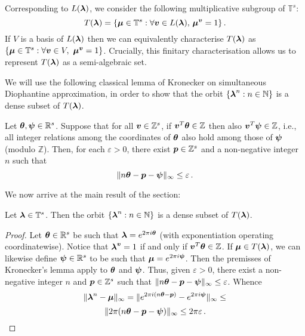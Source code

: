 Corresponding to $L(\boldsymbol{\lambda})$, we consider the following
multiplicative subgroup of $\mathbb{T}^s$:
\begin{equation*}
T(\boldsymbol{\lambda})=\lbrace \boldsymbol \mu\in\mathbb{T}^s : \forall \boldsymbol v\in L(\boldsymbol\lambda),\,\boldsymbol\mu^{\boldsymbol v}=1\rbrace \, .
\end{equation*}
If $V$ is a basis of $L(\boldsymbol{\lambda})$ then we can
equivalently characterise $T(\boldsymbol{\lambda})$ as $\{
\boldsymbol{\mu} \in \mathbb{T}^s: \forall \boldsymbol{v}\in
V,\,\,\boldsymbol\mu^{\boldsymbol v}=1\}$.  Crucially, this finitary
characterisation allows us to represent $T(\boldsymbol\lambda)$ as a
semi-algebraic set.

We will use the following classical lemma of Kronecker on simultaneous
Diophantine approximation, in order to show that the orbit $\lbrace
\boldsymbol\lambda^n : n\in\mathbb{N} \rbrace$ is a dense subset of
$T(\boldsymbol{\lambda})$.

\begin{lemma}
  Let $\boldsymbol \theta,\boldsymbol \psi\in\mathbb{R}^s$. Suppose that for all $\boldsymbol v\in\mathbb{Z}^s$, if
  $\boldsymbol v^T\boldsymbol \theta\in\mathbb{Z}$ then also
  $\boldsymbol v^T\boldsymbol\psi\in\mathbb{Z}$, i.e., all integer
  relations among the coordinates of $\boldsymbol \theta$ also hold
  among those of $\boldsymbol\psi$ (modulo $\mathbb{Z}$). Then, for
  each $\varepsilon>0$, there exist $\boldsymbol p\in\mathbb{Z}^s$ and
  a non-negative integer $n$ such that
\[ \| n\boldsymbol\theta - \boldsymbol p - \boldsymbol\psi \|_\infty \leq\varepsilon \, .\]
\end{lemma}

We now arrive at the main result of the section:

\begin{theorem}
\label{dense}
Let $\boldsymbol{\lambda}\in\mathbb{T}^s$. Then the orbit $\lbrace \boldsymbol\lambda^n : n\in\mathbb{N} \rbrace$ is a dense subset of $T(\boldsymbol{\lambda})$.
\end{theorem}

\begin{proof}
  Let $\boldsymbol \theta\in\mathbb{R}^s$ be such that
  $\boldsymbol\lambda=e^{2\pi i\boldsymbol\theta}$ (with
  exponentiation operating coordinatewise). Notice that
  $\boldsymbol\lambda^{\boldsymbol v}=1$ if and only if $\boldsymbol v^T
  \boldsymbol\theta\in\mathbb{Z}$. If $\boldsymbol\mu\in
  T(\boldsymbol{\lambda})$, we can likewise define
  $\boldsymbol\psi\in\mathbb{R}^s$ to be such that
  $\boldsymbol\mu=e^{2\pi i \boldsymbol\psi}$. Then the premisses of
  Kronecker's lemma apply to $\boldsymbol \theta$ and $\boldsymbol
  \psi$. Thus, given $\varepsilon>0$, there exist a non-negative
  integer $n$ and $\boldsymbol p\in\mathbb{Z}^s$ such that $\|
  n\boldsymbol \theta -\boldsymbol p-\boldsymbol \psi \|_\infty
  \leq\varepsilon$. Whence
\[ \| \boldsymbol\lambda^n-\boldsymbol\mu \|_\infty = \| e^{2\pi i(n\boldsymbol\theta-\boldsymbol p)}-e^{2\pi i \boldsymbol\psi} \|_\infty \leq \]
\[ \| 2\pi (n\boldsymbol \theta -\boldsymbol p - \boldsymbol \psi) \|_\infty \leq 2\pi\varepsilon \, .\]
\end{proof}

